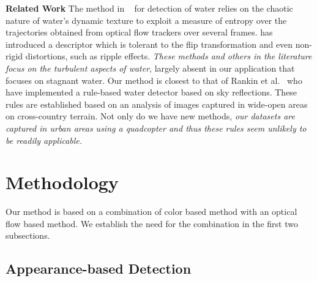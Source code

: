 \documentclass[times,10pt,twocolumn]{article}
\begin{document}
\textbf{Related Work} The method in ~\cite{santana12} for detection of
water relies on the chaotic nature of water's dynamic texture to
exploit a measure of entropy over the trajectories obtained from
optical flow trackers over several frames. \cite{zhang10} has
introduced a descriptor which is tolerant to the flip transformation
and even non-rigid distortions, such as ripple effects.  \emph{These
  methods and others in the literature focus on the turbulent aspects
  of water}, largely absent in our application that focuses on
stagnant water.  Our method is closest to that of Rankin et
al.~\cite{rankin2004daytime, rankin11} who have implemented a rule-based water
detector based on sky reflections.  These rules are established
based on an analysis of images captured in wide-open areas on
cross-country terrain. Not only do we have new methods, \emph{our
datasets are captured in urban areas using a quadcopter and thus these
rules seem unlikely to be readily applicable.}


\section{Methodology}  Our method is based on a combination of color
based method with an optical flow based method.  We establish the
need for the combination in the first two subsections.

\subsection{Appearance-based Detection }
\end{document}
